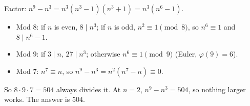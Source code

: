 Factor: $n^9-n^3=n^3\left(n^3-1\right)\left(n^3+1\right)=n^3\left(n^6-1\right)$.
\begin{itemize}
\item Mod $8$: if $n$ is even, $8\mid n^3$; if $n$ is odd, $n^2\equiv1\pmod8$, so $n^6\equiv1$ and $8\mid n^6-1$.
\item Mod $9$: if $3\mid n$, $27\mid n^3$; otherwise $n^6\equiv1\pmod9$ (Euler, $\varphi(9)=6$).
\item Mod $7$: $n^7\equiv n$, so $n^9-n^3=n^2\left(n^7-n\right)\equiv0$.
\end{itemize}
So $8\cdot9\cdot7=504$ always divides it. At $n=2$, $n^9-n^3=504$, so nothing larger works. The answer is $\boxed{504}$.
